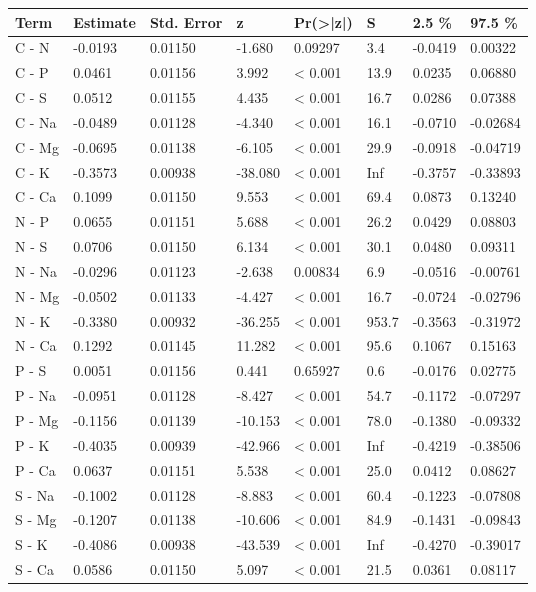 
\begin{tabular}[t]{llllllll}
\toprule
Term & Estimate & Std. Error & z & Pr(>|z|) & S & 2.5 \% & 97.5 \%\\
\midrule
C - N & -0.0193 & 0.01150 & -1.680 & 0.09297 & 3.4 & -0.0419 & 0.00322\\
C - P & 0.0461 & 0.01156 & 3.992 & < 0.001 & 13.9 & 0.0235 & 0.06880\\
C - S & 0.0512 & 0.01155 & 4.435 & < 0.001 & 16.7 & 0.0286 & 0.07388\\
C - Na & -0.0489 & 0.01128 & -4.340 & < 0.001 & 16.1 & -0.0710 & -0.02684\\
C - Mg & -0.0695 & 0.01138 & -6.105 & < 0.001 & 29.9 & -0.0918 & -0.04719\\
C - K & -0.3573 & 0.00938 & -38.080 & < 0.001 & Inf & -0.3757 & -0.33893\\
C - Ca & 0.1099 & 0.01150 & 9.553 & < 0.001 & 69.4 & 0.0873 & 0.13240\\
N - P & 0.0655 & 0.01151 & 5.688 & < 0.001 & 26.2 & 0.0429 & 0.08803\\
N - S & 0.0706 & 0.01150 & 6.134 & < 0.001 & 30.1 & 0.0480 & 0.09311\\
N - Na & -0.0296 & 0.01123 & -2.638 & 0.00834 & 6.9 & -0.0516 & -0.00761\\
N - Mg & -0.0502 & 0.01133 & -4.427 & < 0.001 & 16.7 & -0.0724 & -0.02796\\
N - K & -0.3380 & 0.00932 & -36.255 & < 0.001 & 953.7 & -0.3563 & -0.31972\\
N - Ca & 0.1292 & 0.01145 & 11.282 & < 0.001 & 95.6 & 0.1067 & 0.15163\\
P - S & 0.0051 & 0.01156 & 0.441 & 0.65927 & 0.6 & -0.0176 & 0.02775\\
P - Na & -0.0951 & 0.01128 & -8.427 & < 0.001 & 54.7 & -0.1172 & -0.07297\\
P - Mg & -0.1156 & 0.01139 & -10.153 & < 0.001 & 78.0 & -0.1380 & -0.09332\\
P - K & -0.4035 & 0.00939 & -42.966 & < 0.001 & Inf & -0.4219 & -0.38506\\
P - Ca & 0.0637 & 0.01151 & 5.538 & < 0.001 & 25.0 & 0.0412 & 0.08627\\
S - Na & -0.1002 & 0.01128 & -8.883 & < 0.001 & 60.4 & -0.1223 & -0.07808\\
S - Mg & -0.1207 & 0.01138 & -10.606 & < 0.001 & 84.9 & -0.1431 & -0.09843\\
S - K & -0.4086 & 0.00938 & -43.539 & < 0.001 & Inf & -0.4270 & -0.39017\\
S - Ca & 0.0586 & 0.01150 & 5.097 & < 0.001 & 21.5 & 0.0361 & 0.08117\\

\end{tabular}
